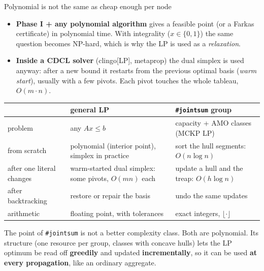 \documentclass[aspectratio=169,11pt]{beamer}
\begin{document}
\begin{frame}{Polynomial is not the same as cheap enough per node}
\footnotesize
\begin{itemize}\setlength\itemsep{2pt}
\item \textbf{Phase I + any polynomial algorithm} gives a feasible point (or a Farkas certificate) in polynomial time.
  With integrality ($x \in \{0,1\}$) the same question becomes NP-hard, which is why the LP is used as a \emph{relaxation}.
\item \textbf{Inside a CDCL solver} (clingo[LP], metaprop) the dual simplex is used anyway: after a new bound it restarts from the
  previous optimal basis (\emph{warm start}), usually with a few pivots. Each pivot touches the whole tableau, $O(m \cdot n)$.
\end{itemize}
\vspace{1mm}
\begin{center}\scriptsize
\begin{tabular}{>{\raggedright\arraybackslash}p{30mm}>{\raggedright\arraybackslash}p{56mm}>{\raggedright\arraybackslash}p{52mm}}\toprule
 & general LP & \texttt{\#jointsum} group\\\midrule
problem & any $Ax \le b$ & 1 capacity + AMO classes (MCKP LP)\\
from scratch & polynomial (interior point), simplex in practice & sort the hull segments: $O(n \log n)$\\
after one literal changes & warm-started dual simplex: some pivots, $O(m n)$ each & update a hull and the treap: $O(h \log n)$\\
after backtracking & restore or repair the basis & undo the same updates\\
arithmetic & floating point, with tolerances & exact integers, $\lfloor\cdot\rfloor$\\\bottomrule
\end{tabular}
\end{center}
\vspace{2mm}
The point of \texttt{\#jointsum} is not a better complexity class. Both are polynomial. Its structure (one resource per group,
classes with concave hulls) lets the LP optimum be read off \textbf{greedily} and updated \textbf{incrementally}, so it can be used
\textbf{at every propagation}, like an ordinary aggregate.
\end{frame}
\end{document}
